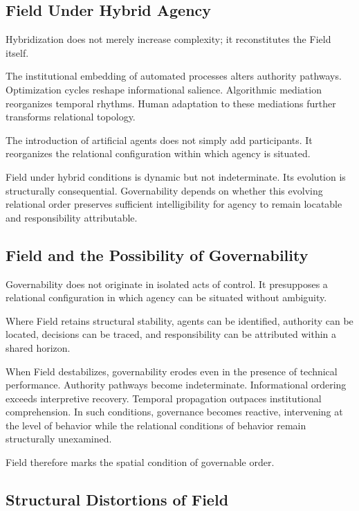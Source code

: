\documentclass[12pt]{article}
\begin{document}
\subsection{Field Under Hybrid Agency}


Hybridization does not merely increase complexity; it reconstitutes the Field itself.

The institutional embedding of automated processes alters authority pathways. Optimization cycles reshape informational salience. Algorithmic mediation reorganizes temporal rhythms. Human adaptation to these mediations further transforms relational topology.

The introduction of artificial agents does not simply add participants. It reorganizes the relational configuration within which agency is situated.

Field under hybrid conditions is dynamic but not indeterminate. Its evolution is structurally consequential. Governability depends on whether this evolving relational order preserves sufficient intelligibility for agency to remain locatable and responsibility attributable.

\subsection{Field and the Possibility of Governability}


Governability does not originate in isolated acts of control. It presupposes a relational configuration in which agency can be situated without ambiguity.

Where Field retains structural stability, agents can be identified, authority can be located, decisions can be traced, and responsibility can be attributed within a shared horizon.

When Field destabilizes, governability erodes even in the presence of technical performance. Authority pathways become indeterminate. Informational ordering exceeds interpretive recovery. Temporal propagation outpaces institutional comprehension. In such conditions, governance becomes reactive, intervening at the level of behavior while the relational conditions of behavior remain structurally unexamined.

Field therefore marks the spatial condition of governable order.

\subsection{Structural Distortions of Field}
\end{document}
